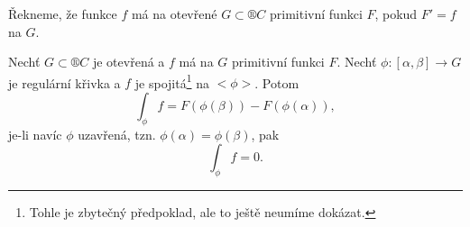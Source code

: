 \documentclass[12pt]{article}					%
\begin{document}
\begin{definice}
	Řekneme, že funkce $f$ má na otevřené $G \subset ®C$ primitivní funkci $F$, pokud $F' = f$ na $G$.
\end{definice}

\begin{veta}
	Nechť $G \subset ®C$ je otevřená a $f$ má na $G$ primitivní funkci $F$. Nechť $\phi:[\alpha, \beta] \rightarrow G$ je regulární křivka a $f$ je spojitá\footnote{Tohle je zbytečný předpoklad, ale to ještě neumíme dokázat.} na $<\phi>$. Potom
	$$ \int_\phi f = F(\phi(\beta)) - F(\phi(\alpha)), $$
	je-li navíc $\phi$ uzavřená, tzn. $\phi(\alpha) = \phi(\beta)$, pak
	$$ \int_\phi f = 0. $$
\end{veta}
\end{document}
